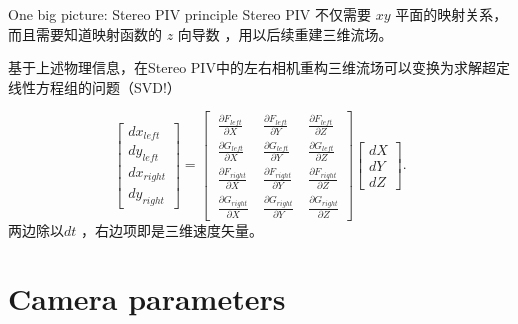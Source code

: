\documentclass[10pt,xcolor={table,dvipsnames},t]{beamer}
\begin{document}
\begin{frame}{One big picture: Stereo PIV principle}
Stereo PIV 不仅需要 $xy$ 平面的映射关系，而且需要知道映射函数的 $z$ 向导数 ，用以后续重建三维流场。

基于上述物理信息，在Stereo PIV中的左右相机重构三维流场可以变换为求解超定线性方程组的问题（SVD!）

$$
\begin{bmatrix}
dx_{left} \\
dy_{left} \\
dx_{right} \\
dy_{right}
\end{bmatrix}
= 
\begin{bmatrix}
\displaystyle\ \frac{ \partial F_{left} }{ \partial X } & \displaystyle\ \frac{ \partial F_{left} }{ \partial Y } & \displaystyle\ \frac{ \partial F_{left} }{ \partial Z }  \\
\displaystyle\ \frac{ \partial G_{left} }{ \partial X } & \displaystyle\ \frac{ \partial G_{left} }{ \partial Y } & \displaystyle\ \frac{ \partial G_{left} }{ \partial Z }  \\
\displaystyle\ \frac{ \partial F_{right} }{ \partial X } & \displaystyle\ \frac{ \partial F_{right} }{ \partial Y } & \displaystyle\ \frac{ \partial F_{right} }{ \partial Z }  \\
\displaystyle\ \frac{ \partial G_{right} }{ \partial X } & \displaystyle\ \frac{ \partial G_{right} }{ \partial Y } & \displaystyle\ \frac{ \partial G_{right} }{ \partial Z }
\end{bmatrix}
\begin{bmatrix}
dX \\
dY \\
dZ
\end{bmatrix}.
$$
两边除以$dt$ ，右边项即是三维速度矢量。

\end{frame}

\section{Camera parameters}
\end{document}
